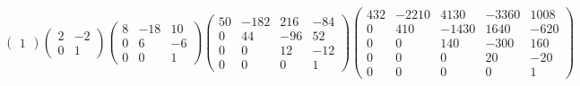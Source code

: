 \[
\left(\begin{array}{r}
1
\end{array}\right)
\left(\begin{array}{rr}
2 & -2 \\
0 & 1
\end{array}\right)
\left(\begin{array}{rrr}
8 & -18 & 10 \\
0 & 6 & -6 \\
0 & 0 & 1
\end{array}\right)
\left(\begin{array}{rrrr}
50 & -182 & 216 & -84 \\
0 & 44 & -96 & 52 \\
0 & 0 & 12 & -12 \\
0 & 0 & 0 & 1
\end{array}\right)
\left(\begin{array}{rrrrr}
432 & -2210 & 4130 & -3360 & 1008 \\
0 & 410 & -1430 & 1640 & -620 \\
0 & 0 & 140 & -300 & 160 \\
0 & 0 & 0 & 20 & -20 \\
0 & 0 & 0 & 0 & 1
\end{array}\right)
\]

